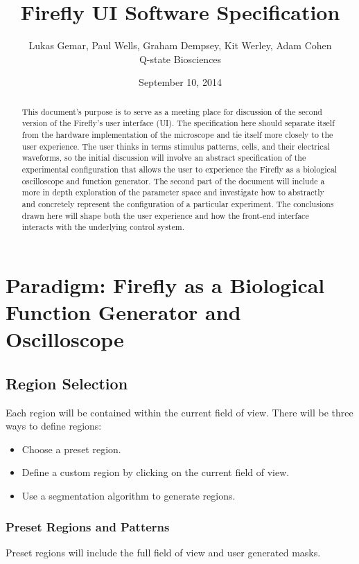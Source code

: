 \documentclass[a4paper,12pt]{article}
\begin{document}
\title{Firefly UI Software Specification}
\author{Lukas Gemar, Paul Wells, Graham Dempsey, Kit Werley, Adam Cohen\\
		Q-state Biosciences}
\date{September 10, 2014}
\maketitle

\begin{abstract}
This document's purpose is to serve as a meeting place for discussion of
the second version of the Firefly's user interface (UI). The specification here
should separate itself from the hardware implementation of the microscope
and tie itself more closely to the user experience. The user thinks in terms
stimulus patterns, cells, and their electrical waveforms, so the initial 
discussion will involve an abstract specification of the experimental configuration 
that allows the user to experience the Firefly as a biological oscilloscope 
and function generator. The second part of the document will include a more 
in depth exploration of the parameter space and investigate how to 
abstractly and concretely represent the configuration of a particular 
experiment. The conclusions drawn here will shape both the user 
experience and how the front-end interface interacts with the underlying 
control system.
\end{abstract}
\section{Paradigm: Firefly as a Biological Function Generator and Oscilloscope}
\subsection{Region Selection}
Each region will be contained within the current field of view. 
There will be three ways to define regions:
\begin{itemize}
 \item Choose a preset region.
 \item Define a custom region by clicking on the current field of view.
 \item Use a segmentation algorithm to generate regions.
\end{itemize}
\subsubsection{Preset Regions and Patterns}
Preset regions will include the full field of view and user generated masks.
\end{document}

